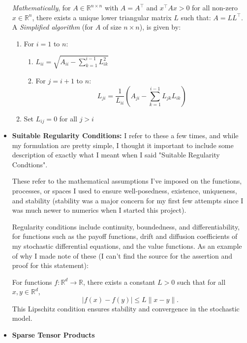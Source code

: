 \documentclass[titlepage]{article}
\begin{document}
\begin{itemize}
    \textit{Mathematically}, for $A \in \mathbb{R}^{n \times n}$ with $A = A^\top$ and $x^\top A x > 0$ for all non-zero $x \in \mathbb{R}^n$, there exists a unique lower triangular matrix $L$ such that: \(A = LL^\top\).
    A \textit{Simplified algorithm} (for $A$ of size $n \times n$), is given by:
    \begin{enumerate}
        \item For $i = 1$ to $n$:
        \begin{enumerate}
            \item $L_{ii} = \sqrt{A_{ii} - \sum_{k=1}^{i-1} L_{ik}^2}$
            \item For $j = i+1$ to $n$:
            \[
            L_{ji} = \frac{1}{L_{ii}} \left(A_{ji} - \sum_{k=1}^{i-1} L_{jk}L_{ik} \right)
            \]
        \end{enumerate}
        \item Set $L_{ij} = 0$ for all $j > i$
    \end{enumerate}

    \item \textbf{Suitable Regularity Conditions:} \label{sec:regularity conditions}I refer to these a few times, and while my formulation are pretty simple, I thought it important to include some description of exactly what I meant when I said "Suitable Regularity Condtions".
    \par These refer to the mathematical assumptions I've imposed on the functions, processes, or spaces I used to ensure well-posedness, existence, uniqueness, and stability (stability was a major concern for my first few attempts since I was much newer to numerics when I started this project). 
    \par Regularity conditions include continuity, boundedness, and differentiability, for functions such as the payoff functions, drift and diffusion coefficients of my stochastic differential equations, and the value functions. As an example of why I made note of these (I can't find the source for the assertion and proof for this statement):
    
    For functions $f: \mathbb{R}^d \to \mathbb{R}$, there exists a constant $L > 0$ such that for all $x, y \in \mathbb{R}^d$,
    \[
    |f(x) - f(y)| \leq L \| x - y \|.
    \]
    This Lipschitz condition ensures stability and convergence in the stochastic model.



    \item \textbf{Sparse Tensor Products} \label{sec:sparse tensor}
    

\end{itemize}
\end{document}
